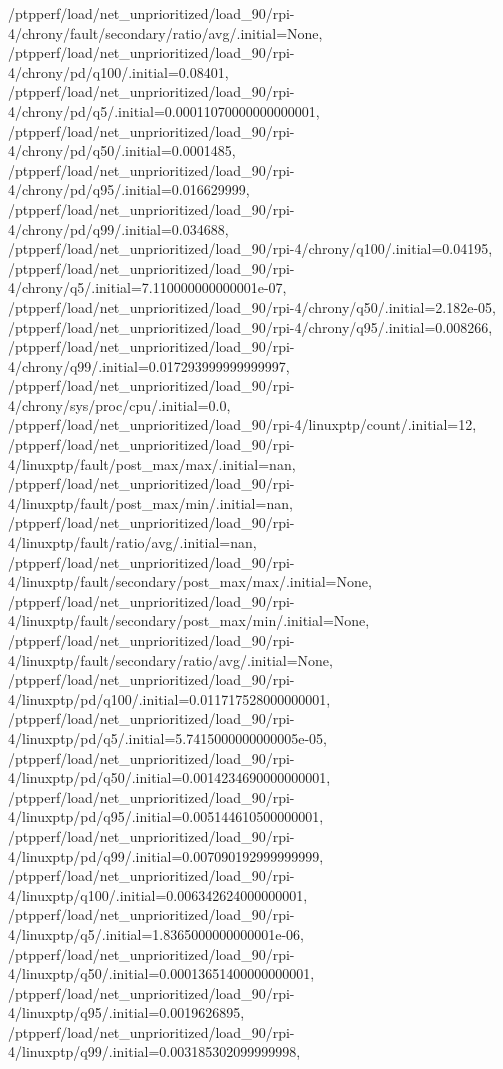 {    /ptpperf/load/net_unprioritized/load_90/rpi-4/chrony/fault/secondary/ratio/avg/.initial=None,
    /ptpperf/load/net_unprioritized/load_90/rpi-4/chrony/pd/q100/.initial=0.08401,
    /ptpperf/load/net_unprioritized/load_90/rpi-4/chrony/pd/q5/.initial=0.00011070000000000001,
    /ptpperf/load/net_unprioritized/load_90/rpi-4/chrony/pd/q50/.initial=0.0001485,
    /ptpperf/load/net_unprioritized/load_90/rpi-4/chrony/pd/q95/.initial=0.016629999,
    /ptpperf/load/net_unprioritized/load_90/rpi-4/chrony/pd/q99/.initial=0.034688,
    /ptpperf/load/net_unprioritized/load_90/rpi-4/chrony/q100/.initial=0.04195,
    /ptpperf/load/net_unprioritized/load_90/rpi-4/chrony/q5/.initial=7.110000000000001e-07,
    /ptpperf/load/net_unprioritized/load_90/rpi-4/chrony/q50/.initial=2.182e-05,
    /ptpperf/load/net_unprioritized/load_90/rpi-4/chrony/q95/.initial=0.008266,
    /ptpperf/load/net_unprioritized/load_90/rpi-4/chrony/q99/.initial=0.017293999999999997,
    /ptpperf/load/net_unprioritized/load_90/rpi-4/chrony/sys/proc/cpu/.initial=0.0,
    /ptpperf/load/net_unprioritized/load_90/rpi-4/linuxptp/count/.initial=12,
    /ptpperf/load/net_unprioritized/load_90/rpi-4/linuxptp/fault/post_max/max/.initial=nan,
    /ptpperf/load/net_unprioritized/load_90/rpi-4/linuxptp/fault/post_max/min/.initial=nan,
    /ptpperf/load/net_unprioritized/load_90/rpi-4/linuxptp/fault/ratio/avg/.initial=nan,
    /ptpperf/load/net_unprioritized/load_90/rpi-4/linuxptp/fault/secondary/post_max/max/.initial=None,
    /ptpperf/load/net_unprioritized/load_90/rpi-4/linuxptp/fault/secondary/post_max/min/.initial=None,
    /ptpperf/load/net_unprioritized/load_90/rpi-4/linuxptp/fault/secondary/ratio/avg/.initial=None,
    /ptpperf/load/net_unprioritized/load_90/rpi-4/linuxptp/pd/q100/.initial=0.011717528000000001,
    /ptpperf/load/net_unprioritized/load_90/rpi-4/linuxptp/pd/q5/.initial=5.7415000000000005e-05,
    /ptpperf/load/net_unprioritized/load_90/rpi-4/linuxptp/pd/q50/.initial=0.0014234690000000001,
    /ptpperf/load/net_unprioritized/load_90/rpi-4/linuxptp/pd/q95/.initial=0.005144610500000001,
    /ptpperf/load/net_unprioritized/load_90/rpi-4/linuxptp/pd/q99/.initial=0.007090192999999999,
    /ptpperf/load/net_unprioritized/load_90/rpi-4/linuxptp/q100/.initial=0.006342624000000001,
    /ptpperf/load/net_unprioritized/load_90/rpi-4/linuxptp/q5/.initial=1.8365000000000001e-06,
    /ptpperf/load/net_unprioritized/load_90/rpi-4/linuxptp/q50/.initial=0.00013651400000000001,
    /ptpperf/load/net_unprioritized/load_90/rpi-4/linuxptp/q95/.initial=0.0019626895,
    /ptpperf/load/net_unprioritized/load_90/rpi-4/linuxptp/q99/.initial=0.003185302099999998,
}
